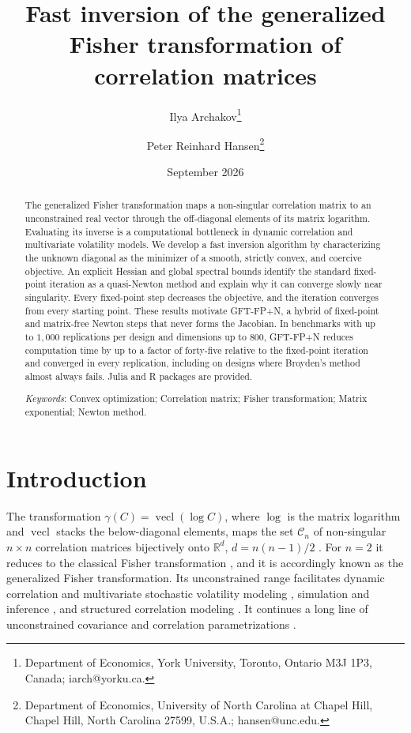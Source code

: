 \documentclass[11pt]{article}
\title{Fast inversion of the generalized Fisher transformation
of correlation matrices}
\author{Ilya Archakov\thanks{Department of Economics, York University,
Toronto, Ontario M3J 1P3, Canada; iarch@yorku.ca.}
\and Peter Reinhard Hansen\thanks{Department of Economics, University
of North Carolina at Chapel Hill, Chapel Hill, North Carolina 27599,
U.S.A.; hansen@unc.edu.}}
\date{September 2026}
\newcommand{\R}{\mathbb{R}}
\newcommand{\vecl}{\operatorname{vecl}}
\newcommand{\Cn}{\mathcal{C}_n}
\begin{document}
\maketitle

\begin{abstract}
\noindent The generalized Fisher transformation maps a non-singular correlation matrix to an unconstrained real vector through the off-diagonal elements of its matrix logarithm. Evaluating its inverse is a computational bottleneck in dynamic correlation and multivariate volatility models. We develop a fast inversion algorithm by characterizing the unknown diagonal as the minimizer of a smooth, strictly convex, and coercive objective. An explicit Hessian and global spectral bounds identify the standard fixed-point iteration as a quasi-Newton method and explain why it can converge slowly near singularity. Every fixed-point step decreases the objective, and the iteration converges from every starting point. These results motivate GFT-FP+N, a hybrid of fixed-point and matrix-free Newton steps that never forms the Jacobian. In benchmarks with up to $1{,}000$ replications per design and dimensions up to $800$, GFT-FP+N reduces computation time by up to a factor of forty-five relative to the fixed-point iteration and converged in every replication, including on designs where Broyden's method almost always fails. Julia and R packages are provided.

\medskip
\noindent\textit{Keywords}: Convex optimization; Correlation matrix;
Fisher transformation; Matrix exponential; Newton method.
\end{abstract}

\section{Introduction}\label{sec:intro}

The transformation $\gamma(C)=\vecl(\log C)$, where $\log$ is the matrix logarithm and $\vecl$ stacks the below-diagonal elements, maps the set $\Cn$ of non-singular $n\times n$ correlation matrices bijectively onto $\R^{d}$, $d=n(n-1)/2$ \citep{ArchakovHansen:Correlation}. For $n=2$ it reduces to the classical Fisher transformation \citep{Fisher:1921}, and it is accordingly known as the generalized Fisher transformation. Its unconstrained range facilitates dynamic correlation and multivariate stochastic volatility modeling \citep{TongHansenArchakov:2026,ChenFeiYu:2025}, simulation and inference \citep{ArchakovHansenLuo-RandomCorr:2024,ArchakovHansen:2026}, and structured correlation modeling \citep{ArchakovHansen:CanonicalBlockMatrix}. It continues a long line of unconstrained covariance and correlation parametrizations \citep{PinheiroBates:1996,Pourahmadi:1999}.
\end{document}
